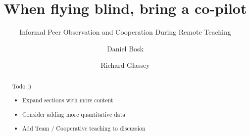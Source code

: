 \documentclass[sigconf]{acmart}
\begin{document}
\title{When flying blind, bring a co-pilot}
\subtitle{Informal Peer Observation and Cooperation During Remote Teaching}


\author{Daniel Bosk}
\orcid{}

\author{Richard Glassey}
\orcid{}


\begin{abstract}
Todo :)

\begin{itemize}
    \item Expand sections with more content
    \item Consider adding more quantitative data
    \item Add Team / Cooperative teaching to discussion
\end{itemize}

\end{abstract}



\begin{CCSXML}

\end{CCSXML}

\end{document}
